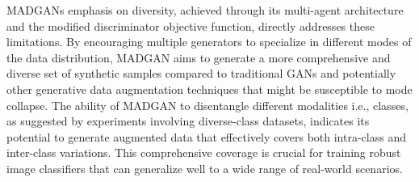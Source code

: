 MADGANs \cite{ghosh2018madgan} emphasis on diversity, achieved through its multi-agent architecture and the modified discriminator objective function, directly addresses these limitations. By encouraging multiple generators to specialize in different modes of the data distribution, MADGAN aims to generate a more comprehensive and diverse set of synthetic samples compared to traditional GANs and potentially other generative data augmentation techniques that might be susceptible to mode collapse. The ability of MADGAN to disentangle different modalities i.e., classes, as suggested by experiments involving diverse-class datasets, indicates its potential to generate augmented data that effectively covers both intra-class and inter-class variations. This comprehensive coverage is crucial for training robust image classifiers that can generalize well to a wide range of real-world scenarios.

\newpage
